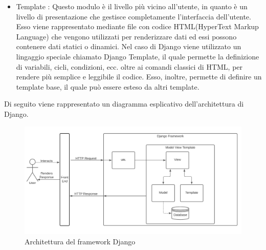 \begin{itemize}
    \item Template : Questo modulo è il livello più vicino all'utente, in quanto è un livello di presentazione che gestisce completamente l'interfaccia dell'utente. Esso viene rappresentato mediante file con codice HTML(HyperText Markup Language) che vengono utilizzati per renderizzare dati ed essi possono contenere dati statici o dinamici. Nel caso di Django viene utilizzato un lingaggio speciale chiamato Django Template, il quale permette la definizione di variabili, cicli, condizioni, ecc. oltre ai comandi classici di HTML, per rendere più semplice e leggibile il codice. Esso, inoltre, permette di definire un template base, il quale può essere esteso da altri template. \cite{django_template}
\end{itemize}


Di seguito viene rappresentato un diagramma esplicativo dell'architettura di Django.

\begin{figure}[H]
    \centering
    \includegraphics[scale=0.5]{images/architettura_django.png}
    \caption{Architettura del framework Django}
    \label{img:architettura_django}

\end{figure}


